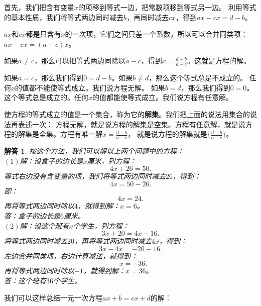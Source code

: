 \documentclass[12pt,UTF8]{ctexbook}
\newtheorem*{so}{解答}
\begin{document}
首先，我们把含有变量$x$的项移到等式一边，把常数项移到等式另一边。
利用等式的基本性质，我们将等式两边同时减去$b$，再同时减去$cx$，得到$ax-cx=d-b$。

$ax$和$cx$都是只含有$x$的一次项，它们之间只差一个系数，所以可以合并同类项：$ax - cx = (a - c)x$。

如果$a\neq c$，那么可以把等式两边同除以$a-c$，得到$x = \frac{d-b}{a-c}$。这就是方程的解。

如果$a = c$，那么我们得到$0 = d-b$。如果$b\neq d$，那么这个等式总是不成立的。
任何$x$的值都不能使等式成立。我们说方程无解。
如果$b = d$，那么我们得到$0 = 0$。这个等式总是成立的。任何$x$的值都能使等式成立。我们说方程有任意解。

使方程的等式成立的值是一个集合，称为它的\textbf{解集}。我们把上面的说法用集合的说法再表述一次：
方程无解，就是说方程的解集是空集。方程有任意解，就是说方程的解集是全集。方程有唯一解$x = \frac{d-b}{a-c}$，
就是说方程的解集就是$\{\frac{d-b}{a-c}\}$。
\begin{so}
    按这个方法，我们可以解以上两个问题中的方程：\\
    $(1)$解：设盒子的边长是$x$厘米，列方程：
    $$ 4x + 26 = 50.$$
    等式右边没有含变量的项，我们将等式两边同时减去$26$，得到：
    $$ 4x = 50 - 26.$$
    即：
    $$ 4x = 24. $$
    再将等式两边同时除以$4$，就得到解：$x=6$。\\
    答：盒子的边长是$6$厘米。\\
    $(2)$解：设这个班有$x$个学生，列方程：
    $$ 3x + 20 = 4x - 16.$$
    将等式两边同时减去$20$，再将等式两边同时减去$4x$，得到：
    $$ 3x - 4x = -20 - 16.$$
    左边合并同类项，右边计算减法，就得到：
    $$ -x = -36. $$
    再将等式两边同时除以$-1$，就得到解：$x = 36$。\\
    答：这个班有$36$个学生。
\end{so}
我们可以这样总结一元一次方程$ax+b=cx+d$的解：
\begin{center}
\end{center}
\end{document}
